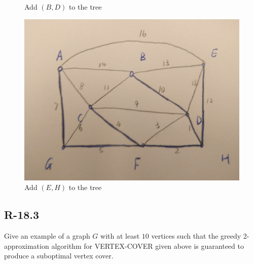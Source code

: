 \documentclass[11pt]{article}
\begin{document}
\begin{figure}[H]
\begin{minipage}[t]{0.50\linewidth}
		\caption{Add $(B,D)$ to the tree}
		\label{fig:subfig1:g}
	\end{minipage}
	\begin{minipage}[t]{0.50\linewidth}
		\centering
		\includegraphics[width=0.85\linewidth]{Figure/1a8.jpg}
		\caption{Add $(E,H)$ to the tree}
		\label{fig:subfig1:h}
	\end{minipage}
\end{figure}
\subsection{R-18.3}
Give an example of a graph $G$ with at least $10$ vertices such that the greedy 2-approximation algorithm for VERTEX-COVER given above is guaranteed to produce a suboptimal vertex cover.
\end{document}
